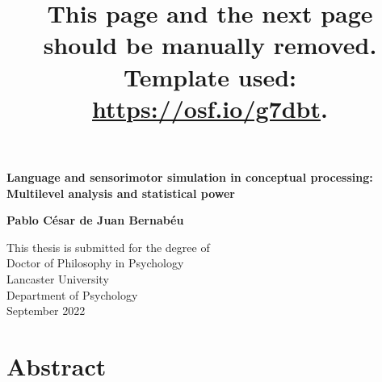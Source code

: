 \documentclass[
  12pt,
  man,floatsintext]{apa7}
\title{This page and the next page should be manually removed. Template used: \url{https://osf.io/g7dbt}.}
\author{\phantom{0}}
\date{}
\affiliation{\phantom{0}}
\begin{document}
\maketitle

\clearpage

\mbox{}\thispagestyle{empty}\clearpage

\setcounter{page}{1}

\thispagestyle{empty}
\begin{center}
\vspace*{10mm}
\textbf{\Large Language and sensorimotor simulation in conceptual processing: Multilevel analysis and statistical power }\\

\bigskip
\bigskip
\bigskip

\textbf{\large Pablo César de Juan Bernabéu }\\

\bigskip
\bigskip
\bigskip
\bigskip
\bigskip
\bigskip
\bigskip
\bigskip
\bigskip
\bigskip
\bigskip

{ 
This thesis is submitted for the degree of  \\
Doctor of Philosophy in Psychology  \\
\bigskip
Lancaster University  \\
Department of Psychology  \\
\bigskip
September 2022  \\
}
\end{center}

\newpage

\hypertarget{abstract}{%
\section{Abstract}\label{abstract}}
\end{document}
